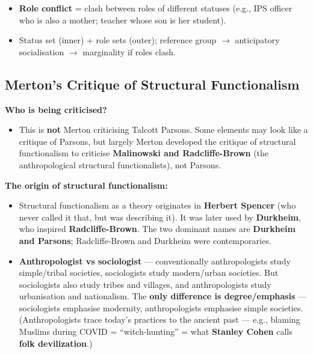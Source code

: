 \begin{QuickRevision}
\begin{itemize}
\item \textbf{Role conflict} = clash between roles of different statuses (e.g., IPS officer who is also a mother; teacher whose son is her student).
\item Status set (inner) + role sets (outer); reference group $\rightarrow$ anticipatory socialisation $\rightarrow$ marginality if roles clash.
\end{itemize}
\end{QuickRevision}

\sectiondivider

\subsection{Merton's Critique of Structural Functionalism}

\begin{CriticalPoint}
\textbf{Who is being criticised?}
\begin{itemize}
\item This is \textbf{not} Merton criticising Talcott Parsons. Some elements may look like a critique of Parsons, but largely Merton developed the critique of structural functionalism to criticise \textbf{Malinowski and Radcliffe-Brown} (the anthropological structural functionalists), not Parsons.
\end{itemize}
\end{CriticalPoint}

\begin{DataFact}
\textbf{The origin of structural functionalism:}
\begin{itemize}
\item Structural functionalism as a theory originates in \textbf{Herbert Spencer} (who never called it that, but was describing it). It was later used by \textbf{Durkheim}, who inspired \textbf{Radcliffe-Brown}. The two dominant names are \textbf{Durkheim and Parsons}; Radcliffe-Brown and Durkheim were contemporaries.
\item \textbf{Anthropologist vs sociologist} --- conventionally anthropologists study simple/tribal societies, sociologists study modern/urban societies. But sociologists also study tribes and villages, and anthropologists study urbanisation and nationalism. The \textbf{only difference is degree/emphasis} --- sociologists emphasise modernity, anthropologists emphasise simple societies. (Anthropologists trace today's practices to the ancient past --- e.g., blaming Muslims during COVID = ``witch-hunting'' = what \textbf{Stanley Cohen} calls \textbf{folk devilization}.)
\end{itemize}
\end{DataFact}

